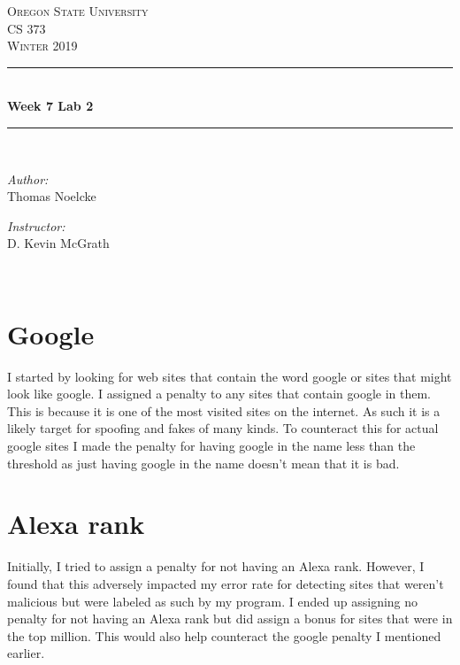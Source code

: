 \documentclass[letterpaper, onecolumn,10pt]{IEEEtran}
\begin{document}
    \begin{titlepage}
    \newcommand{\HRule}{\rule{\linewidth}{0.5mm}}
    \center
    \textsc{\Large Oregon State University}\\[1.5cm]
    \textsc{\Large CS 373}\\[0.5cm]
    \textsc{\Large Winter 2019}\\[0.5cm]
    \HRule \\[0.4cm]
    { \huge \bfseries Week 7 Lab 2}\\[0.4cm] %
    \HRule \\[1.5cm]
    \begin{minipage}{0.4\textwidth}
        \begin{flushleft} \large
        \emph{Author:}\\
        Thomas Noelcke
        \end{flushleft}
    \end{minipage}
    \begin{minipage}{0.4\textwidth}
        \begin{flushright} \large
        \emph{Instructor:} \\
        D. Kevin McGrath\\
        \end{flushright}
    \end{minipage}\\[2cm]
		\end{titlepage}
		
		\section{Google}
		I started by looking for web sites that contain the word google or sites that might look like google. I assigned a penalty to any sites that contain google in them. This is because it is one of the most visited sites on the internet. As such it is a likely target for spoofing and fakes of many kinds. To counteract this for actual google sites I made the penalty for having google in the name less than the threshold as just having google in the name doesn't mean that it is bad.\\
		
		\section{Alexa rank}
		Initially, I tried to assign a penalty for not having an Alexa rank. However, I found that this adversely impacted my error rate for detecting sites that weren't malicious but were labeled as such by my program. I ended up assigning no penalty for not having an Alexa rank but did assign a bonus for sites that were in the top million. This would also help counteract the google penalty I mentioned earlier.\\
		
\end{document}
